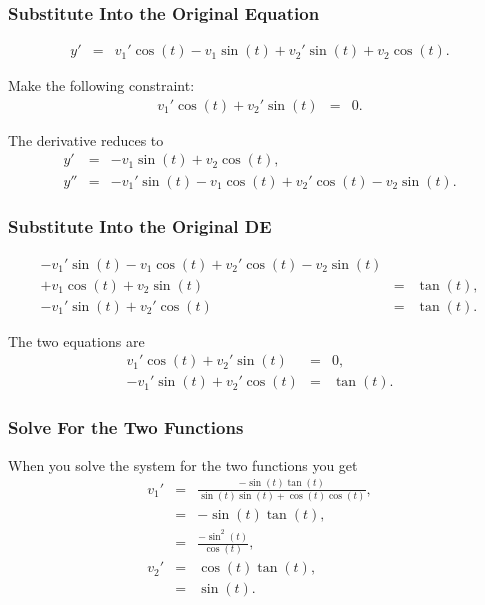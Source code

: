 \begin{frame}
  \frametitle{Substitute Into the Original Equation}

  \begin{eqnarray*}
    y' & = & v_1' \cos(t) - v_1 \sin(t) + v_2' \sin(t) + v_2 \cos(t).
  \end{eqnarray*}

  Make the following constraint:
  \begin{eqnarray*}
    v_1' \cos(t) + v_2' \sin(t)  & = & 0.
  \end{eqnarray*}

  The derivative reduces to
  \begin{eqnarray*}
    y' & = & - v_1 \sin(t) + v_2 \cos(t), \\
    y'' & = & - v_1' \sin(t) - v_1 \cos(t) + v_2' \cos(t) - v_2 \sin(t).
  \end{eqnarray*}


\end{frame}

\begin{frame}
  \frametitle{Substitute Into the Original DE}

  \begin{eqnarray*}
    - v_1' \sin(t) - v_1 \cos(t) + v_2' \cos(t) - v_2 \sin(t) & & \\
    + v_1 \cos(t) + v_2 \sin(t) & = & \tan(t), \\
    - v_1' \sin(t) + v_2' \cos(t) & = & \tan(t).
  \end{eqnarray*}

  The two equations are
  \begin{eqnarray*}
    v_1' \cos(t) + v_2' \sin(t)  & = & 0, \\
    - v_1' \sin(t) + v_2' \cos(t) & = & \tan(t).
  \end{eqnarray*}

\end{frame}

\begin{frame}
  \frametitle{Solve For the Two Functions}

  When you solve the system for the two functions you get
  \begin{eqnarray*}
    v_1' & = & \frac{-\sin(t)\tan(t)}{\sin(t)\sin(t)+\cos(t)\cos(t)}, \\
    & = & -\sin(t)\tan(t), \\
    & = & \frac{-\sin^2(t)}{\cos(t)}, \\
    v_2' & = & \cos(t)\tan(t), \\
    & = & \sin(t).
  \end{eqnarray*}

\end{frame}


